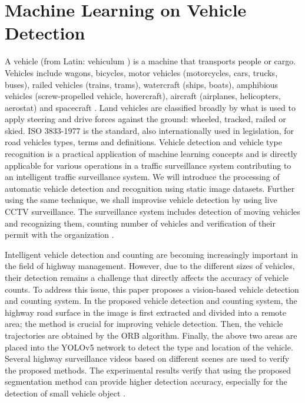 \chapter[Machine Learning on Vehicle Detection]{Machine Learning on Vehicle Detection}

\regularsection
\headerregularsection

\updatemylof %

\begin{sloppypar} %

A vehicle (from Latin: vehiculum \cite{vehicleDef}) is a machine that transports people or cargo. Vehicles include wagons, bicycles, motor vehicles (motorcycles, cars, trucks, buses), railed vehicles (trains, trams), watercraft (ships, boats), amphibious vehicles (screw-propelled vehicle, hovercraft), aircraft (airplanes, helicopters, aerostat) and spacecraft \cite{wikipediaVehicle}. Land vehicles are classified broadly by what is used to apply steering and drive forces against the ground: wheeled, tracked, railed or skied. ISO 3833-1977 is the standard, also internationally used in legislation, for road vehicles types, terms and definitions. Vehicle detection and vehicle type recognition is a practical application of machine learning concepts and is directly applicable for various operations in a traffic surveillance system contributing to an intelligent traffic surveillance system. We will introduce the processing of automatic vehicle detection and recognition using static image datasets. Further using the same technique, we shall improvise vehicle detection by using live CCTV surveillance. The surveillance system includes detection of moving vehicles and recognizing them, counting number of vehicles and verification of their permit with the organization \cite{SriashikaAddala2020}.

Intelligent vehicle detection and counting are becoming increasingly important in the field of highway management. However, due to the different sizes of vehicles, their detection remains a challenge that directly affects the accuracy of vehicle counts. To address this issue, this paper proposes a vision-based vehicle detection and counting system. In the proposed vehicle detection and counting system, the highway road surface in the image is first extracted and divided into a remote area; the method is crucial for improving vehicle detection. Then, the vehicle trajectories are obtained by the ORB algorithm. Finally, the above two areas are placed into the YOLOv5 network to detect the type and location of the vehicle. Several highway surveillance videos based on different scenes are used to verify the proposed methods. The experimental results verify that using the proposed segmentation method can provide higher detection accuracy, especially for the detection of small vehicle object \cite{SongH2019}. 


\end{sloppypar}
